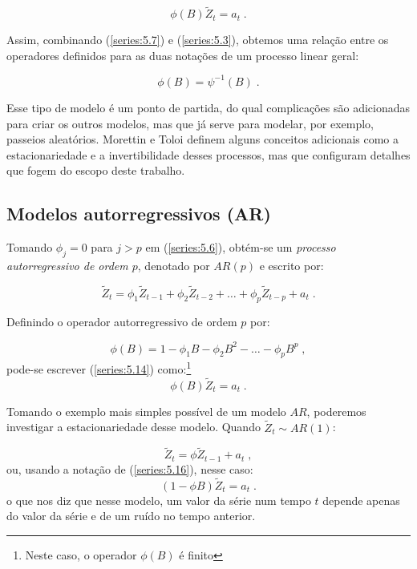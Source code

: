 \begin{equation}\label{series:5.7}
\phi(B)\tilde{Z}_t = a_t\;.
\end{equation}

Assim, combinando (\ref{series:5.7}) e (\ref{series:5.3}), obtemos uma relação entre os operadores definidos para as duas notações de um processo linear geral:

\begin{equation}\label{series:5.9}
\phi(B) = \psi^{-1}(B)\;.
\end{equation}

Esse tipo de modelo é um ponto de partida, do qual complicações são adicionadas para criar os outros modelos, mas que já serve para modelar, por exemplo, passeios aleatórios. Morettin e Toloi \citep{morettin} definem alguns conceitos adicionais como a estacionariedade e a invertibilidade desses processos, mas que configuram detalhes que fogem do escopo deste trabalho.


\subsection{Modelos autorregressivos (AR)}

Tomando $\phi_j = 0$ para $j > p$ em (\ref{series:5.6}), obtém-se um \emph{processo autorregressivo de ordem $p$}, denotado por $AR(p)$ e escrito por:

\begin{equation}\label{series:5.14}
\tilde{Z}_t = \phi_1 \tilde{Z}_{t-1} + \phi_2 \tilde{Z}_{t-2} + \ldots + \phi_p \tilde{Z}_{t-p} + a_t\;.
\end{equation}

Definindo o operador autorregressivo de ordem $p$ por:

\[
\phi(B) = 1 - \phi_1 B - \phi_2 B^2 - \ldots - \phi_p B^p\;,
\]
pode-se escrever (\ref{series:5.14}) como:\footnote{Neste caso, o operador $\phi(B)$ é finito}
\begin{equation}\label{series:5.16}
\phi(B)\tilde{Z}_t = a_t\;.
\end{equation}

Tomando o exemplo mais simples possível de um modelo $AR$, poderemos investigar a estacionariedade desse modelo. Quando $\tilde{Z}_t \sim AR(1)$:

\begin{equation}\label{series:5.17}
\tilde{Z}_t = \phi \tilde{Z}_{t-1} + a_t\;,
\end{equation}
ou, usando a notação de (\ref{series:5.16}), nesse caso:
\[
(1 - \phi B)\tilde{Z}_t = a_t\;.
\]
o que nos diz que nesse modelo, um valor da série num tempo $t$ depende apenas do valor da série e de um ruído no tempo anterior.

